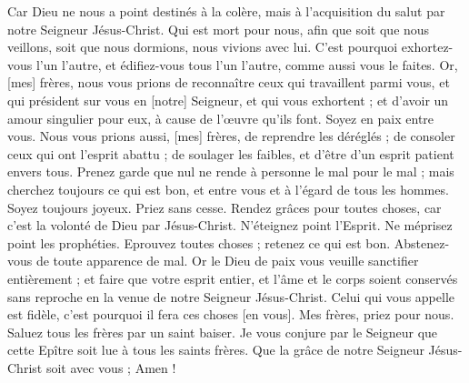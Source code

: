 \begin{multicols}{2}
Car Dieu ne nous a point destinés à la colère, mais à l'acquisition du salut par notre Seigneur Jésus-Christ.
Qui est mort pour nous, afin que soit que nous veillons, soit que nous dormions, nous vivions avec lui.
C'est pourquoi exhortez-vous l'un l'autre, et édifiez-vous tous l'un l'autre, comme aussi vous le faites.
Or, [mes] frères, nous vous prions de reconnaître ceux qui travaillent parmi vous, et qui président sur vous en [notre] Seigneur, et qui vous exhortent ;
et d'avoir un amour singulier pour eux, à cause de l'œuvre qu'ils font. Soyez en paix entre vous.
Nous vous prions aussi, [mes] frères, de reprendre les déréglés ; de consoler ceux qui ont l'esprit abattu ; de soulager les faibles, et d'être d'un esprit patient envers tous.
Prenez garde que nul ne rende à personne le mal pour le mal ; mais cherchez toujours ce qui est bon, et entre vous et à l'égard de tous les hommes.
Soyez toujours joyeux.
Priez sans cesse.
Rendez grâces pour toutes choses, car c'est la volonté de Dieu par Jésus-Christ.
N'éteignez point l'Esprit.
Ne méprisez point les prophéties.
Eprouvez toutes choses ; retenez ce qui est bon.
Abstenez-vous de toute apparence de mal.
Or le Dieu de paix vous veuille sanctifier entièrement ; et faire que votre esprit entier, et l'âme et le corps soient conservés sans reproche en la venue de notre Seigneur Jésus-Christ.
Celui qui vous appelle est fidèle, c'est pourquoi il fera ces choses [en vous].
Mes frères, priez pour nous.
Saluez tous les frères par un saint baiser.
Je vous conjure par le Seigneur que cette Epître soit lue à tous les saints frères.
Que la grâce de notre Seigneur Jésus-Christ soit avec vous ; Amen !
\PPE{}
\end{multicols}
